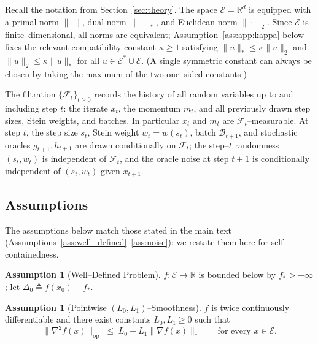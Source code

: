 \documentclass{article}
\theoremstyle{plain}
\theoremstyle{definition}
\newtheorem{assumption}[theorem]{Assumption}
\theoremstyle{remark}
\begin{document}
Recall the notation from Section~\ref{sec:theory}. The space $\mathcal{E}
= \mathbb{R}^d$ is equipped with a primal norm $\|\cdot\|$, dual norm
$\|\cdot\|_*$, and Euclidean norm $\|\cdot\|_2$. Since $\mathcal{E}$ is
finite--dimensional, all norms are equivalent; Assumption~\ref{ass:app:kappa}
below fixes the relevant compatibility constant $\kappa \geq 1$
satisfying $\|u\|_* \leq \kappa \|u\|_2$ and $\|u\|_2 \leq \kappa \|u\|_*$
for all $u \in \mathcal{E}^* \cup \mathcal{E}$. (A single symmetric
constant can always be chosen by taking the maximum of the two
one--sided constants.)

The filtration $\{\mathcal{F}_t\}_{t \geq 0}$ records the history of all
random variables up to and including step $t$: the iterate $x_t$, the
momentum $m_t$, and all previously drawn step sizes, Stein weights, and
batches. In particular $x_t$ and $m_t$ are $\mathcal{F}_t$--measurable.
At step $t$, the step size $s_t$, Stein weight $w_t = w(s_t)$, batch
$\mathcal{B}_{t+1}$, and stochastic oracles $g_{t+1}, h_{t+1}$ are drawn
conditionally on $\mathcal{F}_t$; the step--$t$ randomness $(s_t, w_t)$
is independent of $\mathcal{F}_t$, and the oracle noise at step $t+1$ is
conditionally independent of $(s_t, w_t)$ given $x_{t+1}$.

\subsection{Assumptions}
\label{app:assumptions}

The assumptions below match those stated in the main text
(Assumptions~\ref{ass:well_defined}--\ref{ass:noise}); we restate them
here for self--containedness.

\begin{assumption}[Well--Defined Problem]
\label{ass:app:wd}
$f : \mathcal{E} \to \mathbb{R}$ is bounded below by $f_* > -\infty$; let
$\Delta_0 \triangleq f(x_0) - f_*$.
\end{assumption}

\begin{assumption}[Pointwise $(L_0, L_1)$--Smoothness]
\label{ass:app:smooth}
$f$ is twice continuously differentiable and there exist constants
$L_0, L_1 \geq 0$ such that
\begin{equation}
  \|\nabla^2 f(x)\|_{\mathrm{op}}
  \;\leq\; L_0 + L_1 \|\nabla f(x)\|_*
  \qquad \text{for every } x \in \mathcal{E}.
  \label{eq:app:L0L1}
\end{equation}
\end{assumption}
\end{document}
